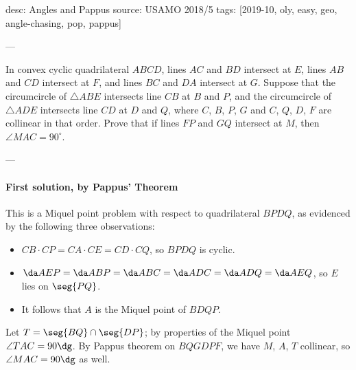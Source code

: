 desc: Angles and Pappus
source: USAMO 2018/5
tags: [2019-10, oly, easy, geo, angle-chasing, pop, pappus]

---

In convex cyclic quadrilateral $ABCD$, lines $AC$ and $BD$ intersect at $E$, lines $AB$ and $CD$ intersect at $F$, and lines $BC$ and $DA$ intersect at $G$. Suppose that the circumcircle of $\triangle ABE$ intersects line $CB$ at $B$ and $P$, and the circumcircle of $\triangle ADE$ intersects line $CD$ at $D$ and $Q$, where $C$, $B$, $P$, $G$ and $C$, $Q$, $D$, $F$ are collinear in that order. Prove that if lines $FP$ and $GQ$ intersect at $M$, then $\angle MAC=90^\circ$.

---

\paragraph{First solution, by Pappus' Theorem} This is a Miquel point problem with respect to quadrilateral $BPDQ$, as evidenced by the following three observations:
\begin{itemize}[itemsep=0em]
    \item $CB\cdot CP=CA\cdot CE=CD\cdot CQ$, so $BPDQ$ is cyclic.
    \item $\da AEP=\da ABP=\da ABC=\da ADC=\da ADQ=\da AEQ$, so $E$ lies on $\seg{PQ}$.
    \item It follows that $A$ is the Miquel point of $BDQP$.
\end{itemize}
Let $T=\seg{BQ}\cap\seg{DP}$; by properties of the Miquel point $\angle TAC=90\dg$. By Pappus theorem on $BQGDPF$, we have $M$, $A$, $T$ collinear, so $\angle MAC=90\dg$ as well.
